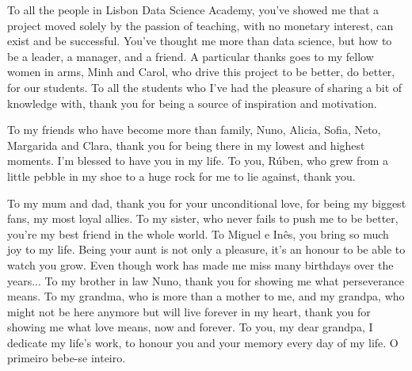 To all the people in Lisbon Data Science Academy, you've showed me that a project moved solely by the passion of teaching, with no monetary interest, can exist and be successful. You've thought me more than data science, but how to be a leader, a manager, and a friend. A particular thanks goes to my fellow women in arms, Minh and Carol, who drive this project to be better, do better, for our students. To all the students who I've had the pleasure of sharing a bit of knowledge with, thank you for being a source of inspiration and motivation. 

To my friends who have become more than family, Nuno, Alicia, Sofia, Neto, Margarida and Clara, thank you for being there in my lowest and highest moments. I'm blessed to have you in my life. To you, Rúben, who grew from a little pebble in my shoe to a huge rock for me to lie against, thank you. 

To my mum and dad, thank you for your unconditional love, for being my biggest fans, my most loyal allies. To my sister, who never fails to push me to be better, you're my best friend in the whole world. To Miguel e Inês, you bring so much joy to my life. Being your aunt is not only a pleasure, it's an honour to be able to watch you grow. Even though work has made me miss many birthdays over the years... To my brother in law Nuno, thank you for showing me what perseverance means. To my grandma, who is more than a mother to me, and my grandpa, who might not be here anymore but will live forever in my heart, thank you for showing me what love means, now and forever. To you, my dear grandpa, I dedicate my life's work, to honour you and your memory every day of my life. O primeiro bebe-se inteiro. 